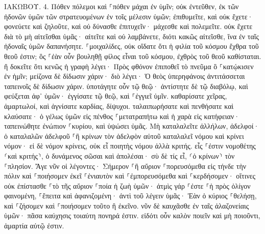 \documentclass[twoside, 9pt]{extreport}
\begin{document}
ΙΑΚΩΒΟΥ.
4.
Πόθεν πόλεμοι καὶ ⸀πόθεν μάχαι ἐν ὑμῖν; οὐκ ἐντεῦθεν, ἐκ τῶν ἡδονῶν ὑμῶν τῶν στρατευομένων ἐν τοῖς μέλεσιν ὑμῶν; 
ἐπιθυμεῖτε, καὶ οὐκ ἔχετε· φονεύετε καὶ ζηλοῦτε, καὶ οὐ δύνασθε ἐπιτυχεῖν· μάχεσθε καὶ πολεμεῖτε. οὐκ ἔχετε διὰ τὸ μὴ αἰτεῖσθαι ὑμᾶς· 
αἰτεῖτε καὶ οὐ λαμβάνετε, διότι κακῶς αἰτεῖσθε, ἵνα ἐν ταῖς ἡδοναῖς ὑμῶν δαπανήσητε. 
⸀μοιχαλίδες, οὐκ οἴδατε ὅτι ἡ φιλία τοῦ κόσμου ἔχθρα τοῦ θεοῦ ἐστιν; ὃς ⸀ἐὰν οὖν βουληθῇ φίλος εἶναι τοῦ κόσμου, ἐχθρὸς τοῦ θεοῦ καθίσταται. 
ἢ δοκεῖτε ὅτι κενῶς ἡ γραφὴ λέγει· Πρὸς φθόνον ἐπιποθεῖ τὸ πνεῦμα ὃ ⸀κατῴκισεν ἐν ἡμῖν; 
μείζονα δὲ δίδωσιν χάριν· διὸ λέγει· Ὁ θεὸς ὑπερηφάνοις ἀντιτάσσεται ταπεινοῖς δὲ δίδωσιν χάριν. 
ὑποτάγητε οὖν τῷ θεῷ· ἀντίστητε δὲ τῷ διαβόλῳ, καὶ φεύξεται ἀφ᾽ ὑμῶν· 
ἐγγίσατε τῷ θεῷ, καὶ ⸀ἐγγιεῖ ὑμῖν. καθαρίσατε χεῖρας, ἁμαρτωλοί, καὶ ἁγνίσατε καρδίας, δίψυχοι. 
ταλαιπωρήσατε καὶ πενθήσατε καὶ κλαύσατε· ὁ γέλως ὑμῶν εἰς πένθος ⸀μετατραπήτω καὶ ἡ χαρὰ εἰς κατήφειαν· 
ταπεινώθητε ἐνώπιον ⸀κυρίου, καὶ ὑψώσει ὑμᾶς. 
Μὴ καταλαλεῖτε ἀλλήλων, ἀδελφοί· ὁ καταλαλῶν ἀδελφοῦ ⸀ἢ κρίνων τὸν ἀδελφὸν αὐτοῦ καταλαλεῖ νόμου καὶ κρίνει νόμον· εἰ δὲ νόμον κρίνεις, οὐκ εἶ ποιητὴς νόμου ἀλλὰ κριτής. 
εἷς ⸀ἐστιν νομοθέτης ⸂καὶ κριτής⸃, ὁ δυνάμενος σῶσαι καὶ ἀπολέσαι· σὺ δὲ τίς εἶ, ⸂ὁ κρίνων⸃ τὸν ⸀πλησίον. 
Ἄγε νῦν οἱ λέγοντες· Σήμερον ⸀ἢ αὔριον ⸀πορευσόμεθα εἰς τήνδε τὴν πόλιν καὶ ⸀ποιήσομεν ἐκεῖ ⸀ἐνιαυτὸν καὶ ⸀ἐμπορευσόμεθα καὶ ⸀κερδήσομεν· 
οἵτινες οὐκ ἐπίστασθε ⸀τὸ τῆς αὔριον ⸀ποία ἡ ζωὴ ὑμῶν· ἀτμὶς γάρ ⸀ἐστε ⸀ἡ πρὸς ὀλίγον φαινομένη, ⸀ἔπειτα καὶ ἀφανιζομένη· 
ἀντὶ τοῦ λέγειν ὑμᾶς· Ἐὰν ὁ κύριος ⸀θελήσῃ, καὶ ⸀ζήσομεν καὶ ⸀ποιήσομεν τοῦτο ἢ ἐκεῖνο. 
νῦν δὲ καυχᾶσθε ἐν ταῖς ἀλαζονείαις ὑμῶν· πᾶσα καύχησις τοιαύτη πονηρά ἐστιν. 
εἰδότι οὖν καλὸν ποιεῖν καὶ μὴ ποιοῦντι, ἁμαρτία αὐτῷ ἐστιν. 
\end{document}
